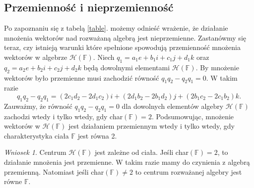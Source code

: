\documentclass[a4paper,twoside,11pt,reqno]{mwrep}
\theoremstyle{plain} \newtheorem{twr}{Twierdzenie}
\theoremstyle{plain} \newtheorem{lem}{Lemat}
\theoremstyle{definition} \newtheorem{defi}{Definicja}
\theoremstyle{remark} \newtheorem*{wni}{Wniosek}
\theoremstyle{definition} \newtheorem{uwaga}{Uwaga}
\theoremstyle{definition}\newtheorem{prz}{Przykład}
\begin{document}
\subsection{Przemienność i nieprzemienność}
Po zapoznaniu się z tabelą \ref{table}. możemy odnieść wrażenie, że działanie mnożenia 
wektorów nad rozważaną algebrą jest nieprzemienne.
Zastanówmy się teraz, czy istnieją warunki które spełnione spowodują przemienność mnożenia wektorów w algebrze 
$\mathcal{H}\left( \mathbb{F}\right)$. Niech 
$q_1=a_1e +b_1 i +c_1j +d_1 k$ oraz $q_2=a_2e +b_2 i +c_2j +d_2 k$ będą dowolnymi elementami 
$\mathcal{H}\left( \mathbb{F}\right)$. By mnożenie wektorów było przemienne musi zachodzić równość $q_1q_2 -q_2q_1 = 0$. W takim razie 
$$q_1q_2 -q_2q_1  = (2c_1d_2 -2d_1c_2)i+(2d_1b_2-2b_1d_2)j+(2b_1c_2-2c_1b_2)k.$$
Zauważmy, że równość $q_1q_2 -q_2q_1 = 0$ dla dowolnych elementów algebry
$\mathcal{H}\left( \mathbb{F}\right)$ zachodzi wtedy i tylko wtedy, gdy char$(\mathbb{F})=2.$
Podsumowując, mnożenie wektorów w $\mathcal{H}\left( \mathbb{F}\right)$ jest działaniem przemiennym wtedy i tylko wtedy, gdy charakterystyka ciała $\mathbb{F}$ jest równa 2.

\begin{wni}

Centrum $\mathcal{H}(\mathbb{F})$ jest zależne od ciała. Jeśli char$ \left( \mathbb{F}
\right) = 2 $, to działanie mnożenia jest przemienne. W takim razie mamy do 
czynienia z algebrą przemienną. Natomiast jeśli char$ \left( \mathbb{F}
\right)\neq 2$ to centrum rozważanej algebry jest równe $\mathbb{F}$. 
\end{wni}
\end{document}

